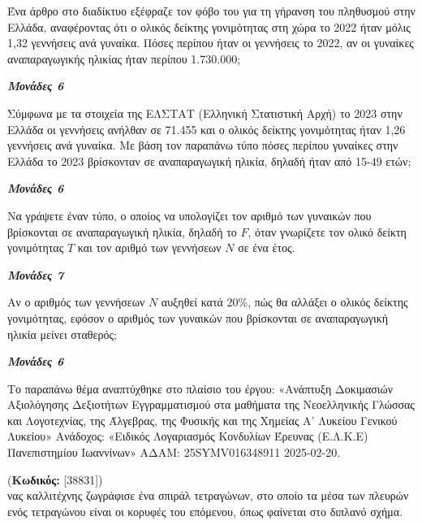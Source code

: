 \documentclass[11pt,a4paper,twoside]{book}
\newcounter{askhsh}[chapter]
\renewcommand{\theaskhsh}{
	\bf{\titlefont{\Large{\thechapter}}.\arabic{askhsh}}
}
\newcommand{\Askhsh}[2]{\refstepcounter{askhsh}{\titlefont{Άσκηση\theaskhsh} - \textcolor{maincolor}{ΘΕΜΑ #2}} (\small{\textbf{Κωδικός:} #1})\\}{}
\newcommand{\monades}[1]{
\hspace*{\fill}
\textbf{\textit{\textcolor{maincolor}{Μονάδες #1}}}}
\begin{document}
\begin{alist}
\item Ένα άρθρο στο διαδίκτυο εξέφραζε τον φόβο του για τη γήρανση του πληθυσμού στην Ελλάδα, αναφέροντας ότι ο ολικός δείκτης γονιμότητας στη χώρα το 2022 ήταν μόλις 1,32 γεννήσεις ανά γυναίκα. Πόσες περίπου ήταν οι γεννήσεις το 2022, αν οι γυναίκες αναπαραγωγικής ηλικίας ήταν περίπου 1.730.000;
\monades{6}
\item Σύμφωνα με τα στοιχεία της ΕΛΣΤΑΤ (Ελληνική Στατιστική Αρχή) το 2023 στην Ελλάδα οι γεννήσεις ανήλθαν σε 71.455 και ο ολικός δείκτης γονιμότητας ήταν 1,26 γεννήσεις ανά γυναίκα. Με βάση τον παραπάνω τύπο πόσες περίπου γυναίκες στην Ελλάδα το 2023 βρίσκονταν σε αναπαραγωγική ηλικία, δηλαδή ήταν από 15-49 ετών;
\monades{6}
\item Να γράψετε έναν τύπο, ο οποίος να υπολογίζει τον αριθμό των γυναικών που βρίσκονται σε αναπαραγωγική ηλικία, δηλαδή το $F$, όταν γνωρίζετε τον ολικό δείκτη γονιμότητας $T$ και τον αριθμό των γεννήσεων $N$ σε ένα έτος.
\monades{7}
\item Αν ο αριθμός των γεννήσεων $N$ αυξηθεί κατά 20\%, πώς θα αλλάξει ο ολικός δείκτης γονιμότητας, εφόσον ο αριθμός των γυναικών που βρίσκονται σε αναπαραγωγική ηλικία μείνει σταθερός;
\monades{6}

{\footnotesize Το παραπάνω θέμα αναπτύχθηκε στο πλαίσιο του έργου: «Ανάπτυξη Δοκιμασιών Αξιολόγησης Δεξιοτήτων Εγγραμματισμού στα μαθήματα της Νεοελληνικής Γλώσσας και Λογοτεχνίας, της Άλγεβρας, της Φυσικής και της Χημείας Α' Λυκείου Γενικού Λυκείου» Ανάδοχος: «Ειδικός Λογαριασμός Κονδυλίων Έρευνας (Ε.Λ.Κ.Ε) Πανεπιστημίου Ιωαννίνων» ΑΔΑΜ: 25SYMV016348911 2025-02-20.}
\end{alist}

\vspace{4mm}

\Askhsh{[38831]}
Ένας καλλιτέχνης ζωγράφισε ένα σπιράλ τετραγώνων, στο οποίο τα μέσα των πλευρών ενός τετραγώνου είναι οι κορυφές του επόμενου, όπως φαίνεται στο διπλανό σχήμα.
\end{document}
